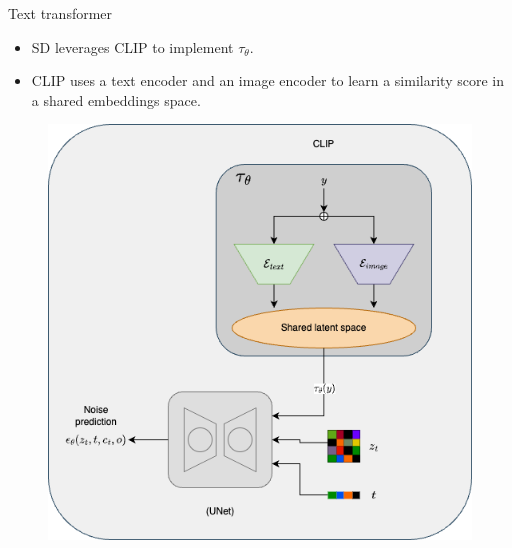 \documentclass[8pt]{beamer}
\begin{document}
\begin{frame}{Text transformer}
    \begin{itemize}
        \item SD leverages CLIP to implement $\tau_{\theta}$.
        \item CLIP uses a text encoder and an image encoder to learn a similarity score in a shared embeddings space.
    \end{itemize}
   \begin{figure}
       \centering
       \includegraphics[scale=.27]{images/sd_with_clip}
       \label{fig:sd_with_clip}
   \end{figure}
\end{frame}
\end{document}
